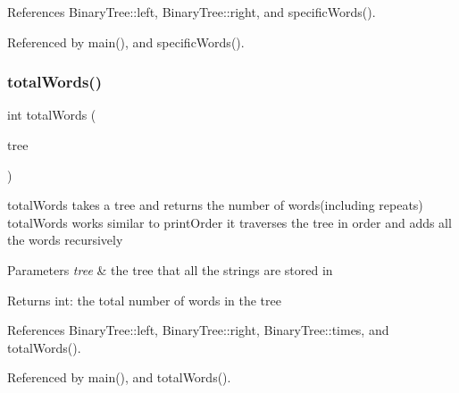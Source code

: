 References Binary\+Tree\+::left, Binary\+Tree\+::right, and specific\+Words().



Referenced by main(), and specific\+Words().

\mbox{\label{tree_8h_a48852a94b6a678216da42240b703f4ef}} 
\subsubsection{total\+Words()}
{\footnotesize\ttfamily int total\+Words (\begin{DoxyParamCaption}\item[{\textbf{ Binary\+Tree} $\ast$}]{tree }\end{DoxyParamCaption})}

total\+Words takes a tree and returns the number of words(including repeats) total\+Words works similar to print\+Order it traverses the tree in order and adds all the words recursively 
\begin{DoxyParams}{Parameters}
{\em tree} & the tree that all the strings are stored in \\
\hline
\end{DoxyParams}
\begin{DoxyReturn}{Returns}
int\+: the total number of words in the tree 
\end{DoxyReturn}


References Binary\+Tree\+::left, Binary\+Tree\+::right, Binary\+Tree\+::times, and total\+Words().



Referenced by main(), and total\+Words().

